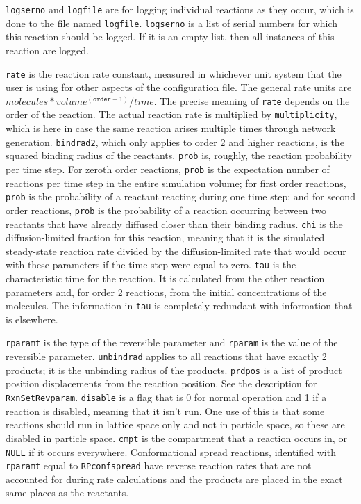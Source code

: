 \documentclass {scrbook}
\newcommand {\ttt} {\texttt}
\begin{document}
\ttt{logserno} and \ttt{logfile} are for logging individual reactions as they occur, which is done to the file named \ttt{logfile}. \ttt{logserno} is a list of serial numbers for which this reaction should be logged. If it is an empty list, then all instances of this reaction are logged.

\ttt{rate} is the reaction rate constant, measured in whichever unit system that the user is using for other aspects of the configuration file. The general rate units are $molecules*volume^{(\ttt{order}-1)}/time$. The precise meaning of \ttt{rate} depends on the order of the reaction. The actual reaction rate is multiplied by \ttt{multiplicity}, which is here in case the same reaction arises multiple times through network generation. \ttt{bindrad2}, which only applies to order 2 and higher reactions, is the squared binding radius of the reactants. \ttt{prob} is, roughly, the reaction probability per time step. For zeroth order reactions, \ttt{prob} is the expectation number of reactions per time step in the entire simulation volume; for first order reactions, \ttt{prob} is the probability of a reactant reacting during one time step; and for second order reactions, \ttt{prob} is the probability of a reaction occurring between two reactants that have already diffused closer than their binding radius. \ttt{chi} is the diffusion-limited fraction for this reaction, meaning that it is the simulated steady-state reaction rate divided by the diffusion-limited rate that would occur with these parameters if the time step were equal to zero. \ttt{tau} is the characteristic time for the reaction. It is calculated from the other reaction parameters and, for order 2 reactions, from the initial concentrations of the molecules. The information in \ttt{tau} is completely redundant with information that is elsewhere.

\ttt{rparamt} is the type of the reversible parameter and \ttt{rparam} is the value of the reversible parameter. \ttt{unbindrad} applies to all reactions that have exactly 2 products; it is the unbinding radius of the products. \ttt{prdpos} is a list of product position displacements from the reaction position. See the description for \ttt{RxnSetRevparam}. \ttt{disable} is a flag that is 0 for normal operation and 1 if a reaction is disabled, meaning that it isn't run. One use of this is that some reactions should run in lattice space only and not in particle space, so these are disabled in particle space. \ttt{cmpt} is the compartment that a reaction occurs in, or \ttt{NULL} if it occurs everywhere. Conformational spread reactions, identified with \ttt{rparamt} equal to \ttt{RPconfspread} have reverse reaction rates that are not accounted for during rate calculations and the products are placed in the exact same places as the reactants.
\end{document}
